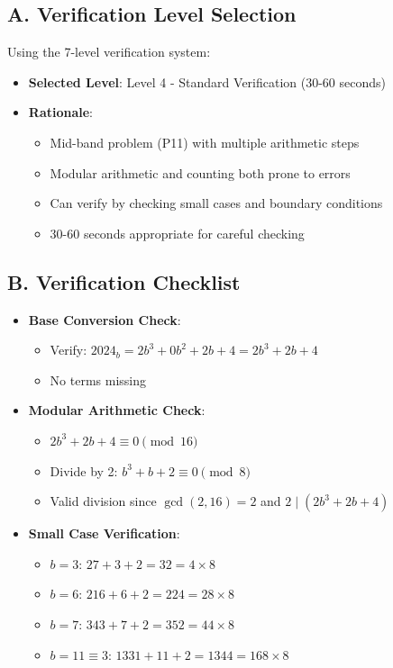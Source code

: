 \documentclass[11pt]{article}
\begin{document}
\begin{verificationbox}
\subsection*{A. Verification Level Selection}

Using the 7-level verification system:

\begin{itemize}[leftmargin=*]
    \item \textbf{Selected Level}: Level 4 - Standard Verification (30-60 seconds)
    \item \textbf{Rationale}: 
    \begin{itemize}
        \item Mid-band problem (P11) with multiple arithmetic steps
        \item Modular arithmetic and counting both prone to errors
        \item Can verify by checking small cases and boundary conditions
        \item 30-60 seconds appropriate for careful checking
    \end{itemize}
\end{itemize}

\subsection*{B. Verification Checklist}
\begin{itemize}[leftmargin=*]
    \item \textbf{Base Conversion Check}: 
    \begin{itemize}
        \item Verify: $2024_b = 2b^3 + 0b^2 + 2b + 4 = 2b^3 + 2b + 4$ \checkmark
        \item No terms missing
    \end{itemize}
    
    \item \textbf{Modular Arithmetic Check}:
    \begin{itemize}
        \item $2b^3 + 2b + 4 \equiv 0 \pmod{16}$
        \item Divide by 2: $b^3 + b + 2 \equiv 0 \pmod{8}$ \checkmark
        \item Valid division since $\gcd(2, 16) = 2$ and $2 \mid (2b^3 + 2b + 4)$
    \end{itemize}
    
    \item \textbf{Small Case Verification}:
    \begin{itemize}
        \item $b = 3$: $27 + 3 + 2 = 32 = 4 \times 8$ \checkmark
        \item $b = 6$: $216 + 6 + 2 = 224 = 28 \times 8$ \checkmark
        \item $b = 7$: $343 + 7 + 2 = 352 = 44 \times 8$ \checkmark
        \item $b = 11 \equiv 3$: $1331 + 11 + 2 = 1344 = 168 \times 8$ \checkmark
    \end{itemize}
    

\end{itemize}
\end{verificationbox}
\end{document}
